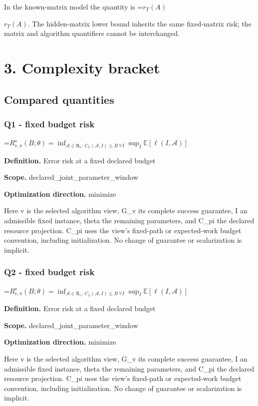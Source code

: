 \documentclass[10pt,a4paper]{article}
\newcommand{\AtlasMath}[1]{\par\begingroup\centering\setbox0=\hbox{$\displaystyle #1$}\ifdim\wd0>1.4\linewidth\typeout{ATLAS WIDE FORMULA: \the\wd0}\fi\ifdim\wd0>\linewidth\resizebox{\linewidth}{!}{\box0}\else\box0\fi\par\endgroup}
\newcommand{\AtlasInlineMath}[1]{\begingroup\setbox0=\hbox{$#1$}\ifdim\wd0>.4\linewidth\endgroup\AtlasMath{#1}\else\endgroup$#1$\fi}
\begin{document}
In the known-matrix model the quantity is \AtlasInlineMath{r_T(A)}. The hidden-matrix lower bound inherits the same fixed-matrix risk; the matrix and algorithm quantifiers cannot be interchanged.

\section{3. Complexity bracket}
\subsection{Compared quantities}
\subsubsection{Q1 - fixed budget risk}
\AtlasMath{R^\star_{v,\pi}(B;\theta)=\inf_{\mathcal A\in\mathfrak A_v:\ C_\pi(\mathcal A,I)\le B\ \forall I}\sup_I\mathbb E[\ell(I,\mathcal A)]}
\textbf{Definition.} Error risk at a fixed declared budget

\textbf{Scope.} declared\_joint\_parameter\_window

\textbf{Optimization direction.} minimize

Here v is the selected algorithm view, G\_v its complete success guarantee, I an admissible fixed instance, theta the remaining parameters, and C\_pi the declared resource projection. C\_pi uses the view's fixed-path or expected-work budget convention, including initialization. No change of guarantee or scalarization is implicit.

\subsubsection{Q2 - fixed budget risk}
\AtlasMath{R^\star_{v,\pi}(B;\theta)=\inf_{\mathcal A\in\mathfrak A_v:\ C_\pi(\mathcal A,I)\le B\ \forall I}\sup_I\mathbb E[\ell(I,\mathcal A)]}
\textbf{Definition.} Error risk at a fixed declared budget

\textbf{Scope.} declared\_joint\_parameter\_window

\textbf{Optimization direction.} minimize

Here v is the selected algorithm view, G\_v its complete success guarantee, I an admissible fixed instance, theta the remaining parameters, and C\_pi the declared resource projection. C\_pi uses the view's fixed-path or expected-work budget convention, including initialization. No change of guarantee or scalarization is implicit.
\end{document}
